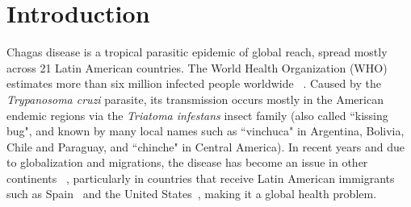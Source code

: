 
\chapter{Introduction}\label{cha:intro}


Chagas disease is a tropical parasitic epidemic of global reach, spread mostly across 21 Latin American countries. The World Health Organization (WHO) estimates more than six million infected people worldwide ~\textcite{who2016}. Caused by the \textit{Trypanosoma cruzi} parasite, its transmission occurs mostly in the American endemic regions via the \textit{Triatoma infestans} insect family (also called ``kissing bug", and known by many local names such as ``vinchuca" in Argentina, Bolivia, Chile and Paraguay, and ``chinche" in Central America). In recent years and due to globalization and migrations, the disease has become an %
issue in other continents ~\textcite{schmunis2010chagas},
particularly in countries that receive Latin American immigrants such as Spain~\textcite{navarro2012chagas} and the United States~\textcite{hotez2013unfolding},
making it a global health problem.


